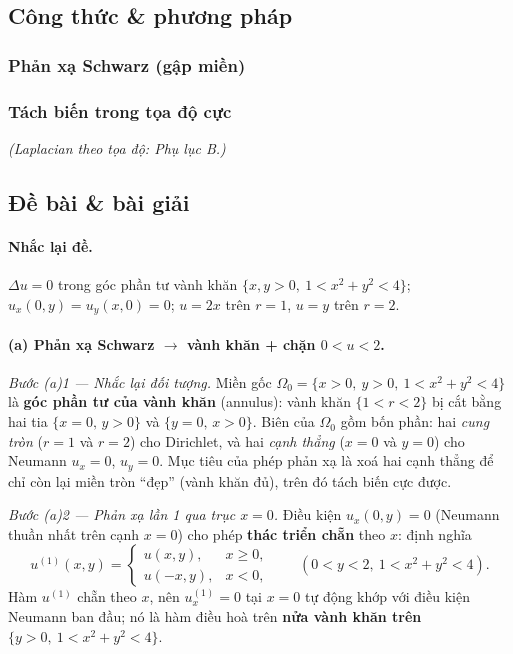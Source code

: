 \subsection*{Công thức \& phương pháp}
\subsubsection*{Phản xạ Schwarz (gập miền)}


\subsubsection*{Tách biến trong tọa độ cực}

\emph{(Laplacian theo tọa độ: Phụ lục B.)}

\subsection*{Đề bài \& bài giải}
\paragraph{Nhắc lại đề.} $\Delta u=0$ trong góc phần tư vành khăn $\{x,y>0,\ 1<x^2+y^2<4\}$;
$u_x(0,y)=u_y(x,0)=0$; $u=2x$ trên $r=1$, $u=y$ trên $r=2$.

\paragraph{(a) Phản xạ Schwarz $\to$ vành khăn + chặn $0<u<2$.}\leavevmode

\emph{Bước (a)1 --- Nhắc lại đối tượng.} Miền gốc $\Omega_0=\{x>0,\ y>0,\ 1<x^2+y^2<4\}$ là \textbf{góc phần tư của vành khăn} (annulus): vành khăn $\{1<r<2\}$ bị cắt bằng hai tia $\{x=0,\,y>0\}$ và $\{y=0,\,x>0\}$. Biên của $\Omega_0$ gồm bốn phần: hai \emph{cung tròn} ($r=1$ và $r=2$) cho Dirichlet, và hai \emph{cạnh thẳng} ($x=0$ và $y=0$) cho Neumann $u_x=0$, $u_y=0$. Mục tiêu của phép phản xạ là xoá hai cạnh thẳng để chỉ còn lại miền tròn ``đẹp'' (vành khăn đủ), trên đó tách biến cực được.

\emph{Bước (a)2 --- Phản xạ lần 1 qua trục $x=0$.} Điều kiện $u_x(0,y)=0$ (Neumann thuần nhất trên cạnh $x=0$) cho phép \textbf{thác triển chẵn} theo $x$: định nghĩa
\[
  u^{(1)}(x,y)=\begin{cases}u(x,y), & x\ge0,\\ u(-x,y), & x<0,\end{cases}\qquad(0<y<2,\ 1<x^2+y^2<4).
\]
Hàm $u^{(1)}$ chẵn theo $x$, nên $u^{(1)}_x=0$ tại $x=0$ tự động khớp với điều kiện Neumann ban đầu; nó là hàm điều hoà trên \textbf{nửa vành khăn trên} $\{y>0,\ 1<x^2+y^2<4\}$.

